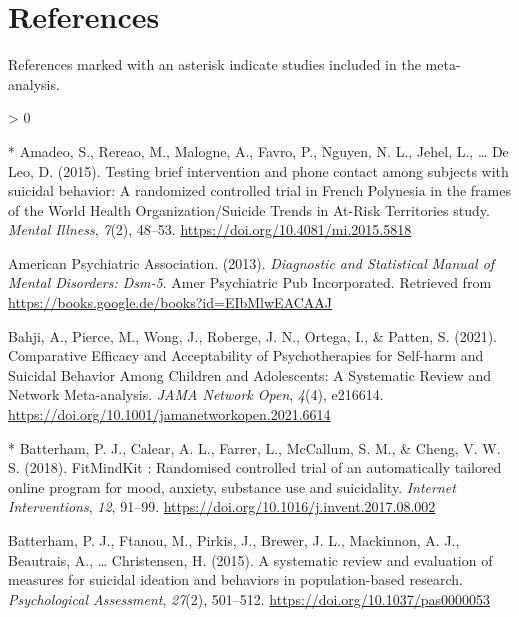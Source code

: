 \documentclass[
  english,
  man]{apa6}
\newlength{\cslhangindent}
\newenvironment{CSLReferences}[2] %
 {%
  \setlength{\parindent}{0pt}
  \ifodd #1 \everypar{\setlength{\hangindent}{\cslhangindent}}\ignorespaces\fi
  \ifnum #2 > 0
  \setlength{\parskip}{#2\baselineskip}
  \fi
 }%
 {}
\begin{document}
\hypertarget{references}{%
\section{References}\label{references}}

\begingroup
\setlength{\parindent}{-0.5in}
\setlength{\leftskip}{0.5in}

References marked with an asterisk indicate studies included in the meta-analysis.

\hypertarget{refs}{}
\begin{CSLReferences}{1}{0}
\leavevmode\hypertarget{ref-amadeo2015}{}%
* Amadeo, S., Rereao, M., Malogne, A., Favro, P., Nguyen, N. L., Jehel, L., \ldots{} De Leo, D. (2015). Testing brief intervention and phone contact among subjects with suicidal behavior: {A} randomized controlled trial in {French Polynesia} in the frames of the {World Health Organization}/{Suicide Trends} in {At-Risk Territories} study. \emph{Mental Illness}, \emph{7}(2), 48--53. \url{https://doi.org/10.4081/mi.2015.5818}

\leavevmode\hypertarget{ref-americanpsychiatricassociation2013a}{}%
American Psychiatric Association. (2013). \emph{Diagnostic and {Statistical Manual} of {Mental Disorders}: {Dsm-5}}. {Amer Psychiatric Pub Incorporated}. Retrieved from \url{https://books.google.de/books?id=EIbMlwEACAAJ}

\leavevmode\hypertarget{ref-bahji2021a}{}%
Bahji, A., Pierce, M., Wong, J., Roberge, J. N., Ortega, I., \& Patten, S. (2021). Comparative {Efficacy} and {Acceptability} of {Psychotherapies} for {Self-harm} and {Suicidal Behavior Among Children} and {Adolescents}: {A Systematic Review} and {Network Meta-analysis}. \emph{JAMA Network Open}, \emph{4}(4), e216614. \url{https://doi.org/10.1001/jamanetworkopen.2021.6614}

\leavevmode\hypertarget{ref-batterham2018}{}%
* Batterham, P. J., Calear, A. L., Farrer, L., McCallum, S. M., \& Cheng, V. W. S. (2018). {FitMindKit} : {Randomised} controlled trial of an automatically tailored online program for mood, anxiety, substance use and suicidality. \emph{Internet Interventions}, \emph{12}, 91--99. \url{https://doi.org/10.1016/j.invent.2017.08.002}

\leavevmode\hypertarget{ref-batterham2015}{}%
Batterham, P. J., Ftanou, M., Pirkis, J., Brewer, J. L., Mackinnon, A. J., Beautrais, A., \ldots{} Christensen, H. (2015). A systematic review and evaluation of measures for suicidal ideation and behaviors in population-based research. \emph{Psychological Assessment}, \emph{27}(2), 501--512. \url{https://doi.org/10.1037/pas0000053}


\end{CSLReferences}
\end{document}
